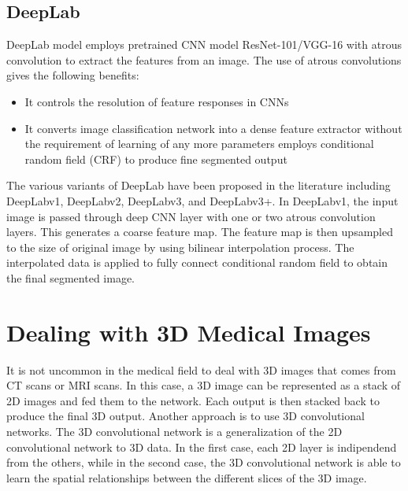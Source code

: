 \subsection{DeepLab}
DeepLab model employs pretrained CNN model ResNet-101/VGG-16 with atrous
convolution to extract the features from an image. The use of atrous
convolutions gives the following benefits:
\begin{itemize}
  \item{It controls the resolution of feature responses in CNNs}
  \item{It converts image classification network into a dense feature extractor
    without the requirement of learning of any more parameters employs
    conditional random field (CRF) to produce fine segmented output}
\end{itemize}
The various variants of DeepLab have been proposed in the literature including
DeepLabv1, DeepLabv2, DeepLabv3, and DeepLabv3+.
In DeepLabv1, the input image is passed through deep CNN layer with one or
two atrous convolution layers. This generates a coarse feature map. The feature
map is then upsampled to the size of original image by using bilinear
interpolation process. The interpolated data is applied to fully connect
conditional random field to obtain the final segmented image.

\section{Dealing with 3D Medical Images}
It is not uncommon in the medical field to deal with 3D images that comes from
CT scans or MRI scans. In this case, a 3D image can be represented as a stack of
2D images and fed them to the network. Each output is then stacked back to
produce the final 3D output. Another approach is to use 3D convolutional
networks. The 3D convolutional network is a generalization of the 2D
convolutional network to 3D data.
In the first case, each 2D layer is indipendend from the others, while in the
second case, the 3D convolutional network is able to learn the spatial
relationships between the different slices of the 3D image.

